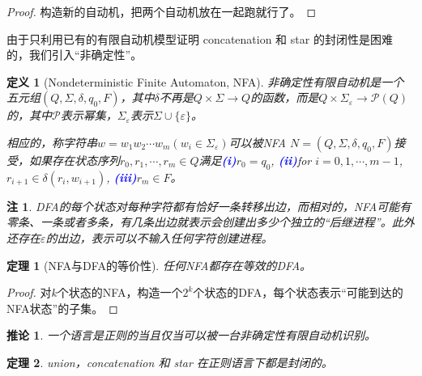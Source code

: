 \documentclass[8pt]{article}
\theoremstyle{compact}
\newtheorem{theorem}{定理}
\newtheorem{definition}{定义}
\newtheorem{corollary}{推论}
\newtheorem{remark}{注}
\def\num#1{\textnormal{\textbf{\mbox{\textcolor{blue}{(#1)}}}}}
\begin{document}
\begin{proof}
	构造新的自动机，把两个自动机放在一起跑就行了。
\end{proof}
\fi
由于只利用已有的有限自动机模型证明 concatenation 和 star 的封闭性是困难的，我们引入“非确定性”。
\begin{definition}[Nondeterministic Finite Automaton, NFA]
	非确定性有限自动机是一个五元组$(Q, \Sigma, \delta, q_0, F)$，其中$\delta$不再是$Q \times \Sigma \to Q$的函数，而是$Q \times \Sigma_{\varepsilon} \to \mathcal P(Q)$的，其中$\mathcal P$表示幂集，$\Sigma_{\varepsilon}$表示$\Sigma \cup \{\varepsilon\}$。

	相应的，称字符串$w = w_1w_2\cdots w_m(w_i \in \Sigma_{\varepsilon})$可以被NFA $N = (Q, \Sigma, \delta, q_0, F)$接受，如果存在状态序列$r_0, r_1, \cdots, r_m \in Q$满足\num{i}$r_0 = q_0$, \num{ii}for $i = 0, 1, \cdots, m-1$, $r_{i+1} \in \delta(r_i, w_{i+1})$, \num{iii}$r_m \in F$。
\end{definition}
\begin{remark}
	DFA的每个状态对每种字符都有恰好一条转移出边，而相对的，NFA可能有零条、一条或者多条，有几条出边就表示会创建出多少个独立的“后继进程”。此外还存在$\varepsilon$的出边，表示可以不输入任何字符创建进程。
\end{remark}
\begin{theorem}[NFA与DFA的等价性]
	任何NFA都存在等效的DFA。
\end{theorem}
\begin{proof}
	对$k$个状态的NFA，构造一个$2^k$个状态的DFA，每个状态表示“可能到达的NFA状态”的子集。
\end{proof}
\begin{corollary}
	一个语言是正则的当且仅当可以被一台非确定性有限自动机识别。
\end{corollary}
\begin{theorem}
	union，concatenation 和 star 在正则语言下都是封闭的。
\end{theorem}
\end{document}
